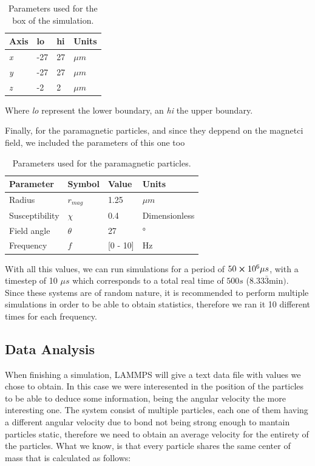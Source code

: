 \begin{table}[H]
\centering
\caption[Simulation box physical parameters.]{Parameters used for the box of the simulation.}
\begin{tabular}{l l l l}
\hline
Axis & lo  & hi & Units \\
\hline
\textit{x} & -27 & 27 & \( \mu m\) \\
\textit{y} & -27 & 27 & \( \mu m\) \\
\textit{z} & -2  & 2   & \( \mu m\)\\ 
\hline
\end{tabular}
\end{table}

Where \textit{lo} represent the lower boundary, an \textit{hi} the upper boundary.

Finally, for the paramagnetic particles, and since they deppend on the magnetci field, we included the parameters of this one too


\begin{table}[H]
\centering
\caption[Paramagnetic colloids parameters.]{Parameters used for the paramagnetic particles.}
\begin{tabular}{l l l l}
\hline
Parameter & Symbol  & Value & Units \\
\hline
Radius & $r_{mag}$ &  1.25 &\( \mu m\) \\
Susceptibility & $\chi$ & 0.4 & Dimensionless\\
Field angle & $\theta$ & 27 & °\\
Frequency & $f$ & [0 - 10] & Hz\\
\hline
\end{tabular}
\end{table}

With all this values, we can run simulations for a period of $50 \cross 10^{6} \mu s$, with a timestep of 10 $\mu s$ which corresponds to a total real time of $500 s$ ($8.33\bar{3} \mathrm{min})$. Since these systems are of random nature, it is recommended to perform multiple simulations in order to be able to obtain statistics, therefore we ran it 10 different times for each frequency.

\subsection{Data Analysis}

When finishing a simulation, LAMMPS will give a text data file with values we chose to obtain. In this case we were interesented in the position of the particles to be able to deduce some information, being the angular velocity the more interesting one. The system consist of multiple particles, each one of them having a different angular velocity due to bond not being strong enough to mantain particles static, therefore we need to obtain an average velocity for the entirety of the particles. What we know, is that every particle shares the same center of mass that is calculated as follows:

